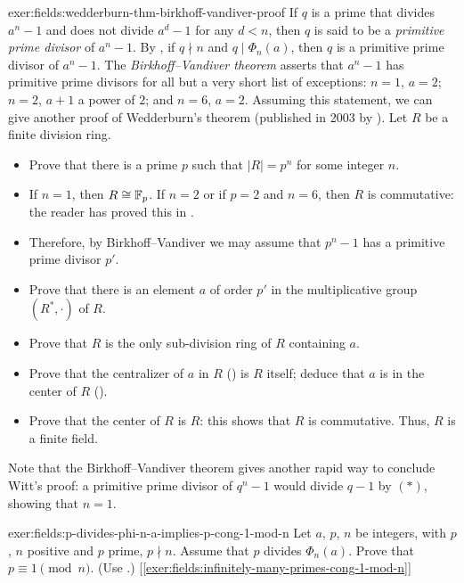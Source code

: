\begin{exer}{}{exer:fields:wedderburn-thm-birkhoff-vandiver-proof}
  If $q$ is a prime that divides $a^n - 1$ and does not divide
  $a^d - 1$ for any $d < n$, then $q$ is said to be a \emph{primitive
    prime divisor} of $a^n - 1$. By
  , if $q \nmid n$
  and $q \mid \Phi_n(a)$, then $q$ is a primitive prime divisor of
  $a^n - 1$. The \emph{Birkhoff--Vandiver theorem} asserts that
  $a^n - 1$ has primitive prime divisors for all but a very short list
  of exceptions: $n = 1$, $a = 2$; $n = 2$, $a + 1$ a power of $2$;
  and $n = 6$, $a = 2$.  Assuming this statement, we can give another
  proof of Wedderburn's theorem (published in 2003 by ). Let $R$ be a finite division ring.
  \begin{itemize}
  \item Prove that there is a prime $p$ such that $|R| = p^n$ for some
    integer $n$.
  \item If $n = 1$, then $R \cong \mathbb{F}_p$. If $n = 2$ or if $p = 2$ and
    $n = 6$, then $R$ is commutative: the reader has proved this in
    .
  \item Therefore, by Birkhoff--Vandiver we may assume that $p^n - 1$
    has a primitive prime divisor $p'$.
  \item Prove that there is an element $a$ of order $p'$ in the
    multiplicative group $(R^*, \cdot)$ of $R$.
  \item Prove that $R$ is the only sub-division ring of $R$ containing
    $a$.
  \item Prove that the centralizer of $a$ in $R$
    () is $R$ itself; deduce
    that $a$ is in the center of $R$
    ().
  \item Prove that the center of $R$ is $R$: this shows that $R$ is
    commutative. Thus, $R$ is a finite field.
  \end{itemize}
  Note that the Birkhoff--Vandiver theorem gives another rapid way to
  conclude Witt's proof: a primitive prime divisor of $q^n - 1$ would
  divide $q - 1$ by $(*)$, showing that $n = 1$.
\end{exer}
\begin{exer}{}{exer:fields:p-divides-phi-n-a-implies-p-cong-1-mod-n}
  Let $a$, $p$, $n$ be integers, with $p$, $n$ positive and $p$ prime,
  $p \nmid n$. Assume that $p$ divides $\Phi_n(a)$. Prove that
  $p \equiv 1 \pmod{n}$. (Use
  .)
  [\ref{exer:fields:infinitely-many-primes-cong-1-mod-n}]
\end{exer}
